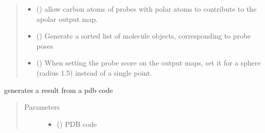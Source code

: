 \documentclass[letterpaper,10pt,english]{sphinxmanual}
\begin{document}
\begin{fulllineitems}
\begin{fulllineitems}
\begin{quote}
\begin{description}
\begin{itemize}
\item {} 
 () \textendash{} allow carbon atoms of probes with polar atoms to contribute to the apolar output map.

\item {} 
 () \textendash{} Generate a sorted list of molecule objects, corresponding to probe poses

\item {} 
 () \textendash{} When setting the probe score on the output maps, set it for a sphere (radius 1.5) instead of a single point.

\end{itemize}

\end{description}\end{quote}

\end{fulllineitems}


\begin{fulllineitems}
\label{\detokenize{calculation_api:hotspots.calculation.Runner.from_pdb}}
generates a result from a pdb code
\begin{quote}\begin{description}
\item[{Parameters}] \leavevmode\begin{itemize}
\item {} 
 () \textendash{} PDB code


\end{itemize}
\end{description}
\end{quote}
\end{fulllineitems}
\end{fulllineitems}
\end{document}
